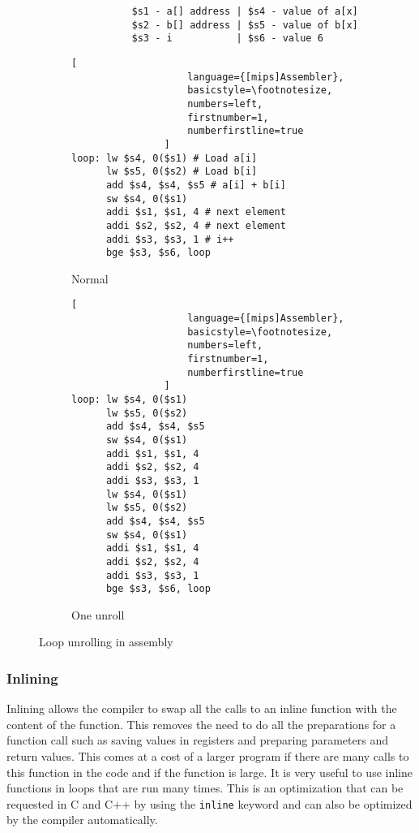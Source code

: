 \ifrelease
\begin{figure}
    \centering
    \begin{adjustbox}{minipage=\linewidth,scale=0.8}
        \begin{verbatim}
                $s1 - a[] address | $s4 - value of a[x]
                $s2 - b[] address | $s5 - value of b[x]
                $s3 - i           | $s6 - value 6
        \end{verbatim}
        \begin{subfigure}{.55\textwidth}
            \centering
            \begin{lstlisting}[
                    language={[mips]Assembler},
                    basicstyle=\footnotesize,
                    numbers=left,
                    firstnumber=1,
                    numberfirstline=true
                ]
loop: lw $s4, 0($s1) # Load a[i]
      lw $s5, 0($s2) # Load b[i]
      add $s4, $s4, $s5 # a[i] + b[i]
      sw $s4, 0($s1)
      addi $s1, $s1, 4 # next element
      addi $s2, $s2, 4 # next element
      addi $s3, $s3, 1 # i++
      bge $s3, $s6, loop
                \end{lstlisting}
            \caption{Normal}
            \label{fig:unroll:sub1}
        \end{subfigure}%
        \begin{subfigure}{.3\textwidth}
            \centering
            \begin{lstlisting}[
                    language={[mips]Assembler},
                    basicstyle=\footnotesize,
                    numbers=left,
                    firstnumber=1,
                    numberfirstline=true
                ]
loop: lw $s4, 0($s1)
      lw $s5, 0($s2)
      add $s4, $s4, $s5
      sw $s4, 0($s1)
      addi $s1, $s1, 4
      addi $s2, $s2, 4
      addi $s3, $s3, 1
      lw $s4, 0($s1)
      lw $s5, 0($s2)
      add $s4, $s4, $s5
      sw $s4, 0($s1)
      addi $s1, $s1, 4
      addi $s2, $s2, 4
      addi $s3, $s3, 1
      bge $s3, $s6, loop
                \end{lstlisting}
            \caption{One unroll}
            \label{fig:unroll:sub2}
        \end{subfigure}
    \end{adjustbox}
    \caption{Loop unrolling in assembly}
    \label{fig:assembly:unroll}
\end{figure}
\fi


\subsubsection{Inlining}
Inlining allows the compiler to swap all the calls to an inline function with the content of the function. This removes the need to do all the preparations for a function call such as saving values in registers and preparing parameters and return values. This comes at a cost of a larger program if there are many calls to this function in the code and if the function is large. It is very useful to use inline functions in loops that are run many times. This is an optimization that can be requested in C and C++ by using the \texttt{inline} keyword and can also be optimized by the compiler automatically.


